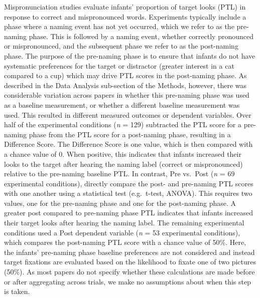 \documentclass[man]{apa6}
\begin{document}
Mispronunciation studies evaluate infants' proportion of target looks (PTL) in response to correct and mispronounced words. Experiments typically include a phase where a naming event has not yet occurred, which we refer to as the pre-naming phase. This is followed by a naming event, whether correctly pronounced or mispronounced, and the subsequent phase we refer to as the post-naming phase. The purpose of the pre-naming phase is to ensure that infants do not have systematic preferences for the target or distractor (greater interest in a cat compared to a cup) which may drive PTL scores in the post-naming phase. As described in the Data Analysis sub-section of the Methods, however, there was considerable variation across papers in whether this pre-naming phase was used as a baseline measurement, or whether a different baseline measurement was used. This resulted in different measured outcomes or dependent variables. Over half of the experimental conditions (\emph{n} = 129) subtracted the PTL score for a pre-naming phase from the PTL score for a post-naming phase, resulting in a Difference Score. The Difference Score is one value, which is then compared with a chance value of 0. When positive, this indicates that infants increased their looks to the target after hearing the naming label (correct or mispronounced) relative to the pre-naming baseline PTL. In contrast, Pre vs.~Post (\emph{n} = 69 experimental conditions), directly compare the post- and pre-naming PTL scores with one another using a statistical test (e.g.~t-test, ANOVA). This requires two values, one for the pre-naming phase and one for the post-naming phase. A greater post compared to pre-naming phase PTL indicates that infants increased their target looks after hearing the naming label. The remaining experimental conditions used a Post dependent variable (\emph{n} = 53 experimental conditions), which compares the post-naming PTL score with a chance value of 50\%. Here, the infants' pre-naming phase baseline preferences are not considered and instead target fixations are evaluated based on the likelihood to fixate one of two pictures (50\%). As most papers do not specify whether these calculations are made before or after aggregating across trials, we make no assumptions about when this step is taken.
\end{document}
